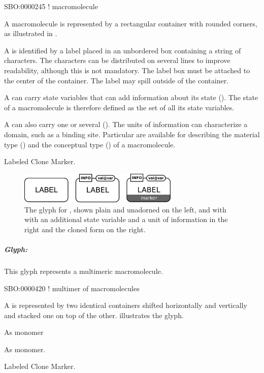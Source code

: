 \begin{glyphDescription}

\glyphSboTerm SBO:0000245 ! macromolecule 

\glyphContainer A macromolecule is represented by a rectangular container with rounded corners, as illustrated in .

\glyphLabel A  is identified by a label placed in an unbordered box containing a string of characters.  The characters can be distributed on several lines to improve readability, although this is not mandatory.  The label box must be attached to the center of the container.  The label may spill outside of the container.

\glyphAux A  can carry state variables that can add information about its state ().  The state of a macromolecule is therefore defined as the set of all its state variables. 

A  can also carry one or several  ().  The units of information can characterize a domain, such as a binding site.  Particular  are available for describing the material type () and the conceptual type () of a macromolecule.  

\glyphCloning Labeled Clone Marker.

\end{glyphDescription}

\begin{figure}[H]
  \centering
  \includegraphics[width = 3in]{images/macromolecule}
  \caption{The \PD glyph for , shown plain and
    unadorned on the left, and with with an additional state variable and a
    unit of information in the right and the cloned form on the right.}
  \label{fig:macromolecule}
\end{figure}


\subparagraph{Glyph: }

This glyph represents a multimeric macromolecule.

\begin{glyphDescription}

\glyphSboTerm SBO:0000420 ! multimer of macromolecules

A  is represented by two identical containers shifted horizontally and vertically and stacked one on top of the other.   illustrates the glyph.

\glyphLabel As monomer

\glyphAux As monomer.

\glyphCloning Labeled Clone Marker.

\end{glyphDescription}

